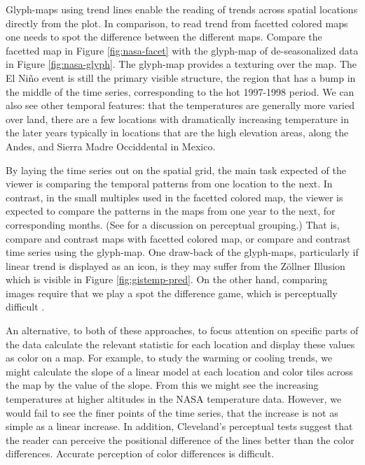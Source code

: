 \documentclass[oneside]{article}
\begin{document}
Glyph-maps using trend lines enable the reading of trends across spatial locations directly from the plot. In comparison, to read trend from facetted colored maps one needs to spot the difference between the different maps.  Compare the facetted map in Figure \ref{fig:nasa-facet} with the glyph-map of de-seasonalized data in Figure \ref{fig:nasa-glyph}. The glyph-map provides a texturing over the map. The El Ni\~no event is still the primary visible structure, the region that has a bump in the middle of the time series, corresponding to the hot 1997-1998 period. We can also see other temporal features: that the temperatures are generally more varied over land, there are a few locations with dramatically increasing temperature in the later years typically in locations that are the high elevation areas, along the Andes, and Sierra Madre Occiddental in Mexico.

By laying the time series out on the spatial grid, the main task expected of the viewer is comparing the temporal patterns from one location to the next. In contrast, in the small multiples used in the facetted colored map, the viewer is expected to compare the patterns in the maps from one year to the next, for corresponding months. (See \citet{carr:1999} for a discussion on perceptual grouping.) That is, compare and contrast maps with facetted colored map, or compare and contrast time series using the glyph-map. One draw-back of the glyph-maps, particularly if linear trend is displayed as an icon, is they may suffer from the Z\"ollner Illusion \citep{Zollner} which is visible in Figure \ref{fig:gistemp-pred}. On the other hand, comparing images require that we play a spot the difference game, which is perceptually difficult \citet{busey}.

An alternative, to both of these approaches, to focus attention on specific parts of the data calculate the relevant statistic for each location and display these values as color on a map. For example, to study the warming or cooling trends, we might calculate the slope of a linear model at each location and color tiles across the map by the value of the slope. From this we might see the increasing temperatures at higher altitudes in the NASA temperature data. However, we would fail to see the finer points of the time series, that the increase is not as simple as a linear increase. In addition, Cleveland's \citep{cleveland:1993a} perceptual tests suggest that the reader can perceive the positional difference of the lines better than the color differences. Accurate perception of color differences is difficult.
\end{document}
